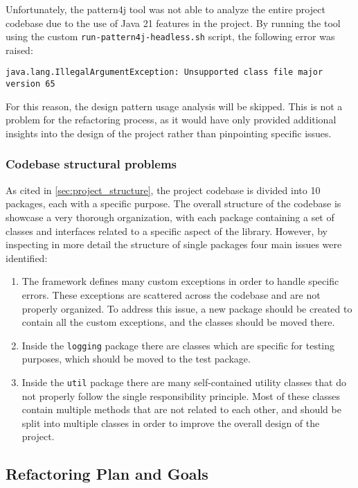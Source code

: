 Unfortunately, the pattern4j tool was not able to analyze the entire project codebase due to the use of Java 21 features in the project. By running the tool using the custom \texttt{run-pattern4j-headless.sh} script, the following error was raised:

\begin{verbatim}
java.lang.IllegalArgumentException: Unsupported class file major version 65
\end{verbatim}

\noindent For this reason, the design pattern usage analysis will be skipped. This is not a problem for the refactoring process, as it would have only provided additional insights into the design of the project rather than pinpointing specific issues.

\subsubsection{Codebase structural problems}

As cited in \autoref{sec:project_structure}, the project codebase is divided into 10 packages, each with a specific purpose. The overall structure of the codebase is showcase a very thorough organization, with each package containing a set of classes and interfaces related to a specific aspect of the library. However, by inspecting in more detail the structure of single packages four main issues were identified:

\begin{enumerate}
	\item The framework defines many custom exceptions in order to handle specific errors. These exceptions are scattered across the codebase and are not properly organized. To address this issue, a new package should be created to contain all the custom exceptions, and the classes should be moved there.
	\item Inside the \texttt{logging} package there are classes which are specific for testing purposes, which should be moved to the test package.
	\item Inside the \texttt{util} package there are many self-contained utility classes that do not properly follow the single responsibility principle. Most of these classes contain multiple methods that are not related to each other, and should be split into multiple classes in order to improve the overall design of the project.
\end{enumerate}

\subsection{Refactoring Plan and Goals}
\label{sec:refactoring_plan}

